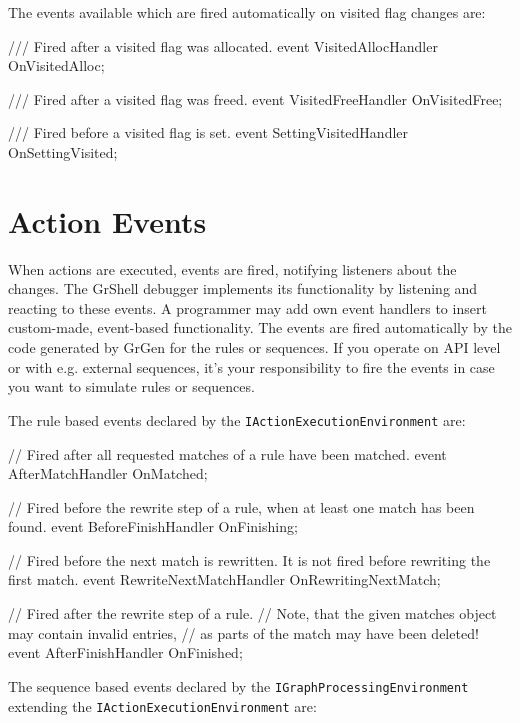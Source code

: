 The events available which are fired automatically on visited flag changes are:

\begin{csharplet}
/// Fired after a visited flag was allocated.
event VisitedAllocHandler OnVisitedAlloc;

/// Fired after a visited flag was freed.
event VisitedFreeHandler OnVisitedFree;

/// Fired before a visited flag is set.
event SettingVisitedHandler OnSettingVisited;
\end{csharplet}

\section{Action Events}\label{sec:actionevent}

When actions are executed, events are fired, notifying listeners about the changes.
The GrShell debugger implements its functionality by listening and reacting to these events.
A programmer may add own event handlers to insert custom-made, event-based functionality.
The events are fired automatically by the code generated by GrGen for the rules or sequences.
If you operate on API level or with e.g. external sequences, it's your responsibility to fire the events in case you want to simulate rules or sequences.

The rule based events declared by the \texttt{IActionExecutionEnvironment} are:

\begin{csharplet}
// Fired after all requested matches of a rule have been matched.
event AfterMatchHandler OnMatched;

// Fired before the rewrite step of a rule, when at least one match has been found.
event BeforeFinishHandler OnFinishing;

// Fired before the next match is rewritten. It is not fired before rewriting the first match.
event RewriteNextMatchHandler OnRewritingNextMatch;

// Fired after the rewrite step of a rule.
// Note, that the given matches object may contain invalid entries,
// as parts of the match may have been deleted!
event AfterFinishHandler OnFinished;
\end{csharplet}

The sequence based events declared by the \texttt{IGraphProcessingEnvironment} extending the \texttt{IActionExecutionEnvironment} are:
         
